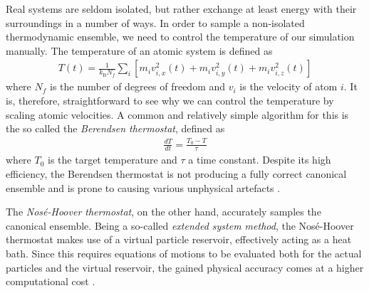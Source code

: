 Real systems are seldom isolated, but rather exchange at least energy with their surroundings in a number of ways. 
In order to sample a non-isolated thermodynamic ensemble, we need to control the temperature of our simulation manually. 
The temperature of an atomic system is defined as
\begin{align}
T(t) = \frac{1}{k_{\text{B}}N_f}\sum_{i}\left[ m_iv_{i,x}^2(t) + m_iv_{i,y}^2(t) + m_iv_{i,z}^2(t)\right]
\end{align}
where $N_f$ is the number of degrees of freedom and $v_{i}$ is the velocity of atom $i$. 
It is, therefore, straightforward to see why we can control the temperature by scaling atomic velocities.
A common and relatively simple algorithm for this is the so called the \textit{Berendsen thermostat}, defined as
\begin{align}
\frac{dT}{dt} = \frac{T_0-T}{\tau}
\end{align}
where $T_0$ is the target temperature and $\tau$ a time constant. 
Despite its high efficiency, the Berendsen thermostat is not producing a fully correct canonical ensemble and is prone to causing various unphysical artefacts \cite{berendsen1984molecular}.

The \textit{Nos\'{e}-Hoover thermostat}, on the other hand, accurately samples the canonical ensemble. 
Being a so-called \textit{extended system method}, the Nos\'{e}-Hoover thermostat makes use of a virtual particle reservoir, effectively acting as a heat bath. 
Since this requires equations of motions to be evaluated both for the actual particles and the virtual reservoir, the gained physical accuracy comes at a higher computational cost \cite{nose1984unified}.


